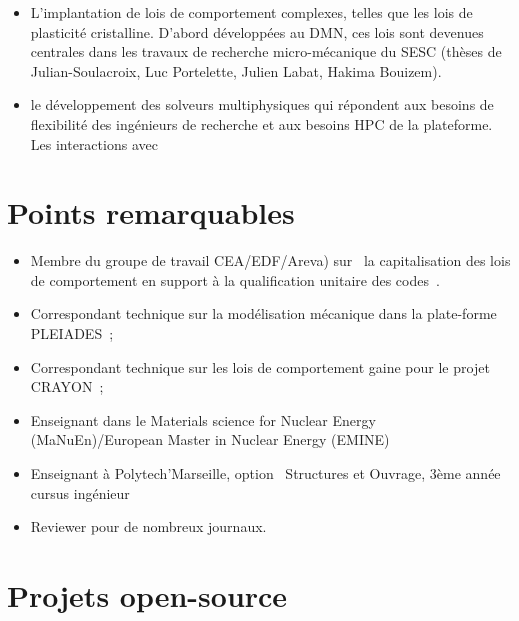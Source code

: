 \begin{itemize}
  \item L'implantation de lois de comportement complexes, telles
  que les lois de plasticité cristalline. D'abord développées au DMN,
  ces lois sont devenues centrales dans les travaux de recherche
  micro-mécanique du SESC (thèses de Julian-Soulacroix, Luc Portelette,
  Julien Labat, Hakima Bouizem).
  \item le développement des solveurs multiphysiques qui
  répondent aux besoins de flexibilité des ingénieurs de recherche et
  aux besoins HPC de la plateforme. Les interactions avec 
\end{itemize}

\section{Points remarquables}

\begin{itemize}
\item Membre du groupe de travail CEA/EDF/Areva) sur \og{}~la
  capitalisation des lois de comportement en support à la
  qualification unitaire des codes~\fg{}.
\item Correspondant technique sur la modélisation mécanique dans la
  plate-forme PLEIADES~;
\item Correspondant technique sur les lois de comportement gaine pour
  le projet CRAYON~;
\item Enseignant dans le Materials science for Nuclear Energy
  (MaNuEn)/European Master in Nuclear Energy (EMINE)
\item Enseignant à Polytech’Marseille, option \og{}~Structures et
  Ouvrage\fg{}, 3ème année cursus ingénieur
\item Reviewer pour de nombreux journaux.
\end{itemize}

\section{Projets open-source}


